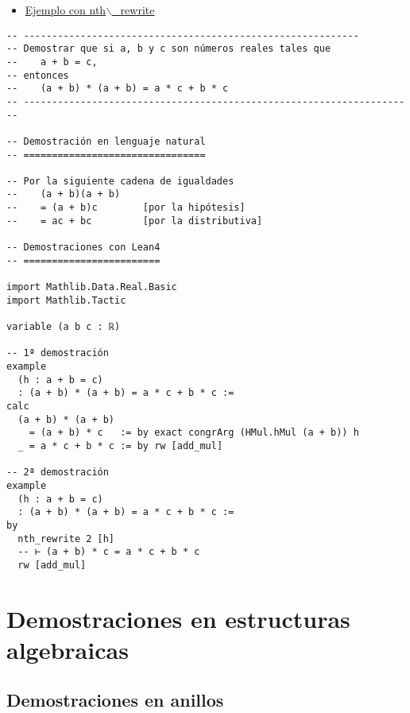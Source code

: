 \begin{itemize}
\item \href{./src/Basicos/Ejemplo\_con\_nth\_rewrite.lean}{Ejemplo con nth$\backslash$\_rewrite}
\end{itemize}
\begin{verbatim}
-- -----------------------------------------------------------
-- Demostrar que si a, b y c son números reales tales que
--    a + b = c,
-- entonces
--    (a + b) * (a + b) = a * c + b * c
-- ---------------------------------------------------------------------

-- Demostración en lenguaje natural
-- ================================

-- Por la siguiente cadena de igualdades
--    (a + b)(a + b)
--    = (a + b)c        [por la hipótesis]
--    = ac + bc         [por la distributiva]

-- Demostraciones con Lean4
-- ========================

import Mathlib.Data.Real.Basic
import Mathlib.Tactic

variable (a b c : ℝ)

-- 1ª demostración
example
  (h : a + b = c)
  : (a + b) * (a + b) = a * c + b * c :=
calc
  (a + b) * (a + b)
    = (a + b) * c   := by exact congrArg (HMul.hMul (a + b)) h
  _ = a * c + b * c := by rw [add_mul]

-- 2ª demostración
example
  (h : a + b = c)
  : (a + b) * (a + b) = a * c + b * c :=
by
  nth_rewrite 2 [h]
  -- ⊢ (a + b) * c = a * c + b * c
  rw [add_mul]
\end{verbatim}

\section{Demostraciones en estructuras algebraicas}
\label{sec:org0483fc1}

\subsection{Demostraciones en anillos}
\label{sec:orge0bfad1}

